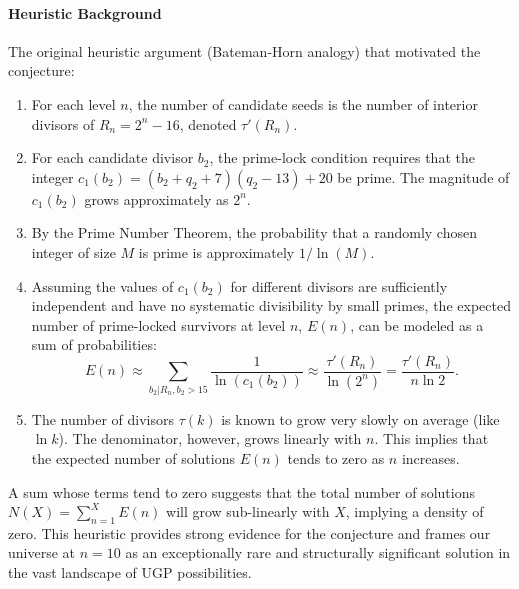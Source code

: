 \documentclass[12pt]{article}
\numberwithin{equation}{section}
\begin{document}
\paragraph{Heuristic Background}
The original heuristic argument (Bateman-Horn analogy) that motivated the conjecture:
\begin{enumerate}[leftmargin=*]
    \item For each level $n$, the number of candidate seeds is the number of interior divisors of $R_n = 2^n - 16$, denoted $\tau'(R_n)$.
    \item For each candidate divisor $b_2$, the prime-lock condition requires that the integer $c_1(b_2) = (b_2 + q_2 + 7)(q_2 - 13) + 20$ be prime. The magnitude of $c_1(b_2)$ grows approximately as $2^n$.
    \item By the Prime Number Theorem, the probability that a randomly chosen integer of size $M$ is prime is approximately $1/\ln(M)$.
    \item Assuming the values of $c_1(b_2)$ for different divisors are sufficiently independent and have no systematic divisibility by small primes, the expected number of prime-locked survivors at level $n$, $E(n)$, can be modeled as a sum of probabilities:
    \begin{equation}
        E(n) \approx \sum_{b_2 | R_n, b_2>15} \frac{1}{\ln(c_1(b_2))} \approx \frac{\tau'(R_n)}{\ln(2^n)} = \frac{\tau'(R_n)}{n \ln 2}.
    \end{equation}
    \item The number of divisors $\tau(k)$ is known to grow very slowly on average (like $\ln k$). The denominator, however, grows linearly with $n$. This implies that the expected number of solutions $E(n)$ tends to zero as $n$ increases.
\end{enumerate}
A sum whose terms tend to zero suggests that the total number of solutions $N(X) = \sum_{n=1}^X E(n)$ will grow sub-linearly with $X$, implying a density of zero. This heuristic provides strong evidence for the conjecture and frames our universe at $n=10$ as an exceptionally rare and structurally significant solution in the vast landscape of UGP possibilities.

\end{document}
